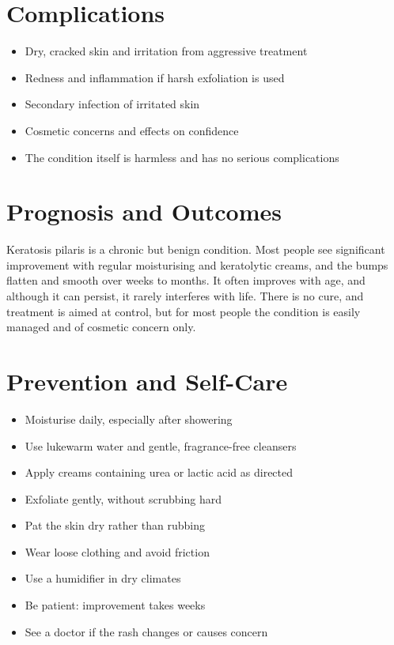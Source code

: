 \section*{Complications}
\begin{itemize}
    \item Dry, cracked skin and irritation from aggressive treatment
    \item Redness and inflammation if harsh exfoliation is used
    \item Secondary infection of irritated skin
    \item Cosmetic concerns and effects on confidence
    \item The condition itself is harmless and has no serious complications
\end{itemize}

\section*{Prognosis and Outcomes}
Keratosis pilaris is a chronic but benign condition. Most people see significant improvement with regular moisturising and keratolytic creams, and the bumps flatten and smooth over weeks to months. It often improves with age, and although it can persist, it rarely interferes with life. There is no cure, and treatment is aimed at control, but for most people the condition is easily managed and of cosmetic concern only.

\section*{Prevention and Self-Care}
\begin{itemize}
    \item Moisturise daily, especially after showering
    \item Use lukewarm water and gentle, fragrance-free cleansers
    \item Apply creams containing urea or lactic acid as directed
    \item Exfoliate gently, without scrubbing hard
    \item Pat the skin dry rather than rubbing
    \item Wear loose clothing and avoid friction
    \item Use a humidifier in dry climates
    \item Be patient: improvement takes weeks
    \item See a doctor if the rash changes or causes concern
\end{itemize}

